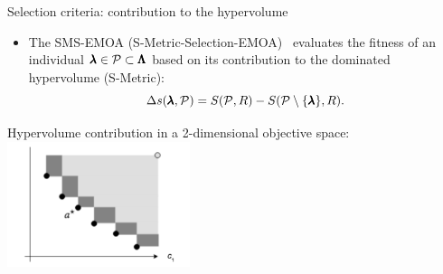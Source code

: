 \begin{frame}[allowframebreaks]{Selection criteria: contribution to the hypervolume}

\begin{itemize}
\item The SMS-EMOA (S-Metric-Selection-EMOA)~ evaluates the fitness of an individual $\pmb{\lambda} \in \mathcal{P} \subset \pmb{\Lambda}$ based on its contribution to the dominated hypervolume (S-Metric):
$$
\Delta s(\pmb{\lambda}, \mathcal{P}) = S(\mathcal{P}, R) - S(\mathcal{P} \setminus \{ \pmb{\lambda}\}, R).
$$
\end{itemize}



\framebreak

\begin{center}
Hypervolume contribution in a 2-dimensional objective space:\\
\includegraphics[width = 0.4\textwidth]{images/hypervolumenbeitrag.png}
\end{center}


\end{frame}
